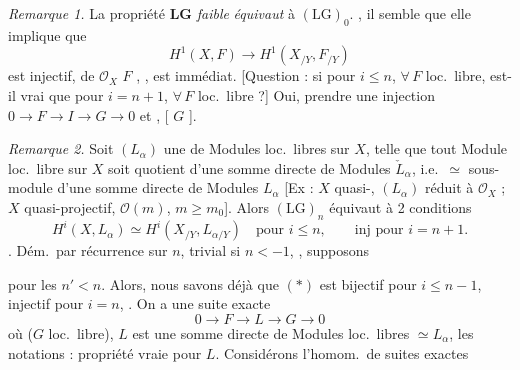 \documentclass[11pt,a4paper]{article}
\begin{document}
\emph{Remarque 1.} La propriété \textbf{LG} \emph{faible} \emph{équivaut} à $(\mathrm{LG})_0$. , il semble \ill{} que elle implique que
\[
  H^1(X, F) \longrightarrow H^1(X_{/Y}, F_{/Y})
\]
est injectif, \ill{} \ill{}  \ill{} de $\mathcal{O}_X$  $F$ \ill{} \ill{} , \ill{} \ill{}, \ill{} \ill{} est immédiat. [Question : si \ill{} \ill{} \ill{} \ill{} pour $i \leq n$, $\forall\, F$ loc.\ libre, est-il vrai que \ill{} \ill{} \ill{} pour \struck{\ill{}} $i = n+1$, $\forall\, F$ loc.\ libre ?] Oui, prendre une \struck{\ill{}} \ill{} injection $0 \to F \to I \to G \to 0$ et  \ill{} \ill{} \ill{} \ill{}, \ill{} \ill{} \ill{} \ill{} \ill{} [\ill{} $G$ \ill{}].

\emph{Remarque 2.} Soit $(L_\alpha)$ une \ill{} de Modules loc.\ libres sur $X$, telle que tout Module loc.\ libre sur $X$ soit quotient d'une somme directe de Modules $\check{L}_\alpha$, i.e.\ $\simeq$ sous-module  d'une somme directe de Modules $L_\alpha$ [Ex : $X$ quasi-, $(L_\alpha)$ réduit à $\mathcal{O}_X$ ; $X$ quasi-projectif, $\mathcal{O}(m)$, $m \geq m_0$]. Alors $(\mathrm{LG})_n$ équivaut à 2 conditions
\[
  H^i(X, L_\alpha) \simeq H^i(X_{/Y}, L_{\alpha/Y}) \quad \text{pour } i \leq n, \qquad \text{inj pour } i = n+1.
\]
. Dém.\ par récurrence sur $n$, trivial si $n < -1$,  \ill{} \ill{}, supposons \ill{} \ill{}

pour les $n' < n$.  Alors, nous savons déjà que $(*)$ est bijectif pour $i \leq n-1$, injectif pour $i = n$, \ill{} \ill{} \ill{} \ill{} \ill{}. On a une suite exacte
\[
  0 \to F \to L \to G \to 0
\]
où ($G$ loc.\ libre), $L$ est une somme directe de Modules loc.\ libres \struck{\ill{}} $\simeq L_\alpha$, \ill{} les notations : propriété  vraie pour $L$. Considérons l'homom.\ de suites exactes

\end{document}
